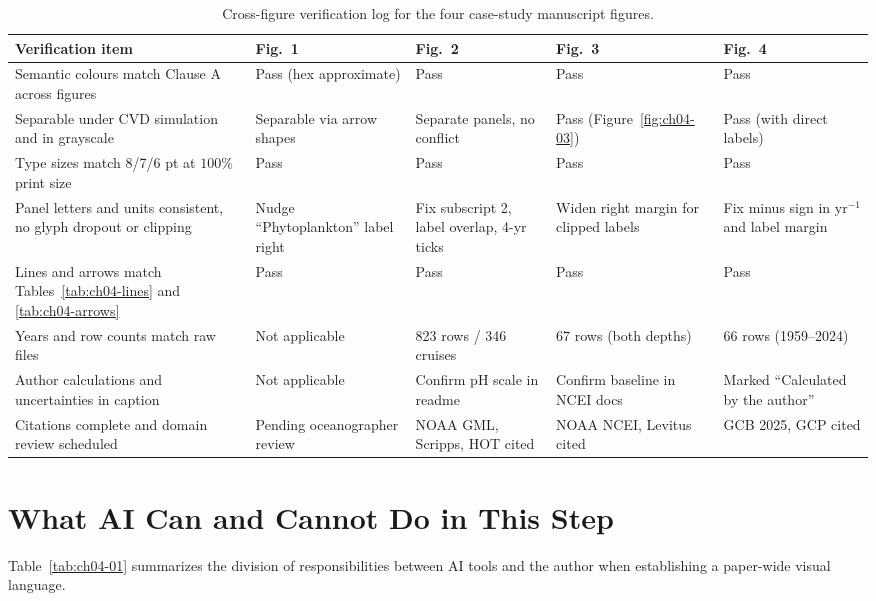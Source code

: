 \begin{table}[htbp]\centering\footnotesize
\setlength{\tabcolsep}{3pt}
\renewcommand{\arraystretch}{1.15}
\caption{Cross-figure verification log for the four case-study manuscript figures.}\label{tab:ch04-verify}
\begin{tabularx}{\linewidth}{@{}>{\raggedright\arraybackslash}p{38mm}YYYY@{}}
\toprule
\textbf{Verification item} & \textbf{Fig.\ 1} & \textbf{Fig.\ 2} & \textbf{Fig.\ 3} & \textbf{Fig.\ 4} \\
\midrule
Semantic colours match Clause A across figures & Pass (hex approximate) & Pass & Pass & Pass \\
Separable under CVD simulation and in grayscale & Separable via arrow shapes & Separate panels, no conflict & Pass (Figure~\ref{fig:ch04-03}) & Pass (with direct labels) \\
Type sizes match 8/7/6 pt at $100\%$ print size & Pass & Pass & Pass & Pass \\
Panel letters and units consistent, no glyph dropout or clipping & Nudge ``Phytoplankton'' label right & Fix subscript 2, label overlap, 4-yr ticks & Widen right margin for clipped labels & Fix minus sign in $\text{yr}^{-1}$ and label margin \\
Lines and arrows match Tables~\ref{tab:ch04-lines} and \ref{tab:ch04-arrows} & Pass & Pass & Pass & Pass \\
Years and row counts match raw files & Not applicable & 823 rows / 346 cruises & 67 rows (both depths) & 66 rows (1959--2024) \\
Author calculations and uncertainties in caption & Not applicable & Confirm pH scale in readme & Confirm baseline in NCEI docs & Marked ``Calculated by the author'' \\
Citations complete and domain review scheduled & Pending oceanographer review & NOAA GML, Scripps, HOT cited & NOAA NCEI, Levitus cited & GCB 2025, GCP cited \\
\bottomrule
\end{tabularx}
\end{table}

\section{What AI Can and Cannot Do in This Step}

Table~\ref{tab:ch04-01} summarizes the division of responsibilities between AI tools and the author when establishing a paper-wide visual language.

